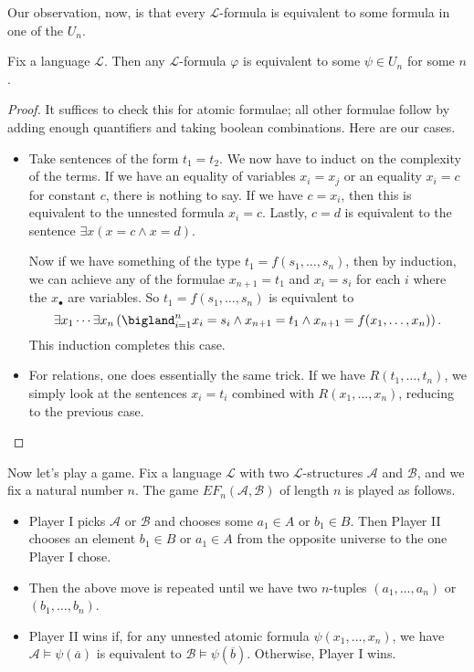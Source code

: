 \documentclass[../notes.tex]{subfiles}
\begin{document}
Our observation, now, is that every $\mathcal L$-formula is equivalent to some formula in one of the $U_n$.
\begin{proposition} %
	Fix a language $\mathcal L$. Then any $\mathcal L$-formula $\varphi$ is equivalent to some $\psi\in U_n$ for some $n$.
\end{proposition}
\begin{proof}
	It suffices to check this for atomic formulae; all other formulae follow by adding enough quantifiers and taking boolean combinations. Here are our cases.
	\begin{itemize}
		\item Take sentences of the form $t_1=t_2$. We now have to induct on the complexity of the terms. If we have an equality of variables $x_i=x_j$ or an equality $x_i=c$ for constant $c$, there is nothing to say. If we have $c=x_i$, then this is equivalent to the unnested formula $x_i=c$. Lastly, $c=d$ is equivalent to the sentence $\exists x(x=c\land x=d)$.

		Now if we have something of the type $t_1=f(s_1,\ldots,s_n)$, then by induction, we can achieve any of the formulae $x_{n+1}=t_1$ and $x_i=s_i$ for each $i$ where the $x_\bullet$ are variables. So $t_1=f(s_1,\ldots,s_n)$ is equivalent to
		\[\exists x_1\cdots\exists x_n\left(\bigland_{i=1}^nx_i=s_i\land x_{n+1}=t_1\land x_{n+1}=f(x_1,\ldots,x_n)\right).\]
		This induction completes this case.

		\item For relations, one does essentially the same trick. If we have $R(t_1,\ldots,t_n)$, we simply look at the sentences $x_i=t_i$ combined with $R(x_1,\ldots,x_n)$, reducing to the previous case.
		\qedhere
	\end{itemize}
\end{proof}
Now let's play a game. Fix a language $\mathcal L$ with two $\mathcal L$-structures $\mathcal A$ and $\mathcal B$, and we fix a natural number $n$. The game $EF_n(\mathcal A,\mathcal B)$ of length $n$ is played as follows.
\begin{itemize}
	\item Player I picks $\mathcal A$ or $\mathcal B$ and chooses some $a_1\in A$ or $b_1\in B$. Then Player II chooses an element $b_1\in B$ or $a_1\in A$ from the opposite universe to the one Player I chose.
	\item Then the above move is repeated until we have two $n$-tuples $(a_1,\ldots,a_n)$ or $(b_1,\ldots,b_n)$.
	\item Player II wins if, for any unnested atomic formula $\psi(x_1,\ldots,x_n)$, we have $\mathcal A\models\psi(\overline a)$ is equivalent to $\mathcal B\models\psi(\overline b)$. Otherwise, Player I wins.
\end{itemize}
\end{document}
